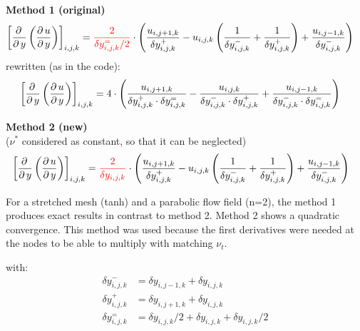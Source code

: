\documentclass[11pt,a4paper]{article}
\begin{document}
\vspace{0.5cm}

\noindent\textbf{Method 1 (original)}
\begin{align*}
\left[ \frac{\partial \, }{\partial \, y}\left( \frac{\partial \, u}{\partial \, y} \right) \right]_{i,j,k}&=
\textcolor{red}{
\frac{2}{\delta y_{i,j,k}^=/2}
}
\cdot
\left(
\frac{u_{i,j+1,k}}{\delta y_{i,j,k}^+}
-
u_{i,j,k}\left(
\frac{1}{\delta y_{i,j,k}^-}
+
\frac{1}{\delta y_{i,j,k}^+} \right)
+
\frac{u_{i,j-1,k}}{\delta y_{i,j,k}^-}
\right)
\end{align*}
rewritten (as in the code):
\begin{align*}
\left[ \frac{\partial \, }{\partial \, y}\left( \frac{\partial \, u}{\partial \, y} \right) \right]_{i,j,k}
&=
4
\cdot
\left(
\frac{u_{i,j+1,k}}{\delta y_{i,j,k}^+\cdot \delta y_{i,j,k}^=}
-
\frac{
u_{i,j,k}
}{
\delta y_{i,j,k}^-\cdot \delta y_{i,j,k}^+
}
+
\frac{u_{i,j-1,k}}{\delta y_{i,j,k}^-\cdot \delta y_{i,j,k}^=}
\right)
\end{align*}

\vspace{0.5cm}

\noindent\textbf{Method 2 (new)}\\
\noindent($\nu^*$ considered as constant, so that it can be neglected)
\begin{align*}
&\left[ \frac{\partial \, }{\partial \, y}\left( \frac{\partial \, u}{\partial \, y} \right) \right]_{i,j,k}=
\textcolor{red}{
\frac{2}{\delta y_{i,j,k}}
}\cdot
\left(
\frac{u_{i,j+1,k}}{\delta y_{i,j,k}^+}
-
u_{i,j,k}\left(
\frac{1}{\delta y_{i,j,k}^-}
+
\frac{1}{\delta y_{i,j,k}^+} \right)
+
\frac{u_{i,j-1,k}}{\delta y_{i,j,k}^-}
\right)
\end{align*}

\vspace{0.5cm}

\noindent For a stretched mesh (tanh) and a parabolic flow field (n=2), the method 1 produces exact results in contrast to method 2. Method 2 shows a quadratic convergence. This method was used because the first derivatives were needed at the nodes to be able to multiply with matching $\nu_t$.

\vfill
with:
\begin{align*}
\delta y_{i,j,k}^- &= \delta y_{i,j-1,k}+\delta y_{i,j,k} \\
\delta y_{i,j,k}^+ &= \delta y_{i,j+1,k}+\delta y_{i,j,k} \\
\delta y_{i,j,k}^=&=\delta y_{i,j,k}/2+ \delta y_{i,j,k}+\delta y_{i,j,k}/2
\end{align*}
\end{document}
